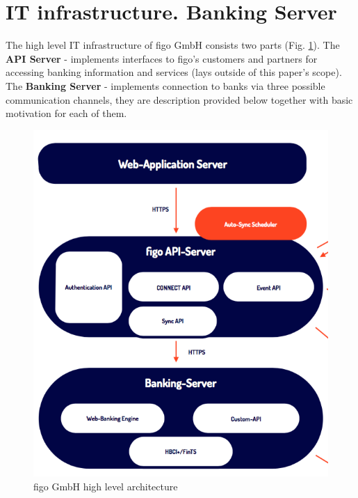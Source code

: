 

\section{IT infrastructure. Banking Server}
The high level IT infrastructure of figo GmbH consists two parts (Fig. \ref{fig:figoArch}). The \textbf{API Server} - implements interfaces to figo's customers and partners for accessing banking information and services (lays outside of this paper's scope). The \textbf{Banking Server} - implements connection to banks via three possible communication channels, they are description provided below together with basic motivation for each of them.
\begin{figure}[ht]
  	\label{fig:figoArch}
    \centering
    \includegraphics[scale=0.3]{grafiken/figoArch.png}
     \caption{figo GmbH high level architecture}
\end{figure}

